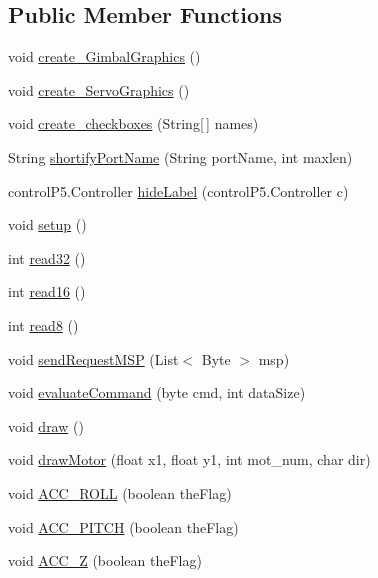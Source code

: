 \subsection*{Public Member Functions}
\begin{DoxyCompactItemize}
\item 
void \hyperlink{classMultiWiiConf_a258e9697d588ea99af87ec28247e4e16}{create\-\_\-\-Gimbal\-Graphics} ()
\item 
void \hyperlink{classMultiWiiConf_a588a52b9b9194d6b7f62662474d57c55}{create\-\_\-\-Servo\-Graphics} ()
\item 
void \hyperlink{classMultiWiiConf_a926ade417ce21f3326c93f8bd1348c77}{create\-\_\-checkboxes} (String\mbox{[}$\,$\mbox{]} names)
\item 
String \hyperlink{classMultiWiiConf_a1c2dc8d157b78a114b18efce73a082c3}{shortify\-Port\-Name} (String port\-Name, int maxlen)
\item 
control\-P5.\-Controller \hyperlink{classMultiWiiConf_a035c449396cb5812f5af4bf9e9c88cfc}{hide\-Label} (control\-P5.\-Controller c)
\item 
void \hyperlink{classMultiWiiConf_a8b52584570b1367ee4ce93e112fbd0ca}{setup} ()
\item 
int \hyperlink{classMultiWiiConf_aab7fc403f177393a58e0006fd38882cb}{read32} ()
\item 
int \hyperlink{classMultiWiiConf_a013c041b164d4a46b4c3444a8ba21cc1}{read16} ()
\item 
int \hyperlink{classMultiWiiConf_aeefc4968d2588d9158941d340486e993}{read8} ()
\item 
void \hyperlink{classMultiWiiConf_aa113c0a77055b4b010b2c4033e510f8e}{send\-Request\-M\-S\-P} (List$<$ Byte $>$ msp)
\item 
void \hyperlink{classMultiWiiConf_ad8ccf8a1d553340481337ca747754a13}{evaluate\-Command} (byte cmd, int data\-Size)
\item 
void \hyperlink{classMultiWiiConf_a94c00cd9bbdb03acbe78a3bde4141cea}{draw} ()
\item 
void \hyperlink{classMultiWiiConf_a2fc869dfda4cb57606fee25d1e3c8c78}{draw\-Motor} (float x1, float y1, int mot\-\_\-num, char dir)
\item 
void \hyperlink{classMultiWiiConf_adbfd907cb05cd32e61f5ac383baddbcd}{A\-C\-C\-\_\-\-R\-O\-L\-L} (boolean the\-Flag)
\item 
void \hyperlink{classMultiWiiConf_aa7c58b0a234c718599c60146e11aeaa2}{A\-C\-C\-\_\-\-P\-I\-T\-C\-H} (boolean the\-Flag)
\item 
void \hyperlink{classMultiWiiConf_afdc8f5a7f9dc70e2c23aa04418a2b80d}{A\-C\-C\-\_\-\-Z} (boolean the\-Flag)

\end{DoxyCompactItemize}
